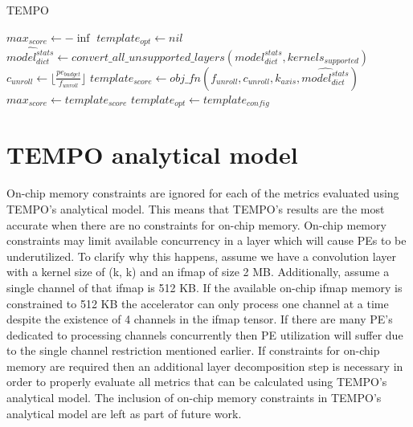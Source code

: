 \begin{algorithm}[H] 
    \caption{\ac{TEMPO}}
    \label{alg:tempo_algo}
    \begin{algorithmic}[1]
    \Statex 
        \State $max_{score} \gets -\inf$
        \State $template_{opt} \gets nil$
        \State $\hat{model^{stats}_{dict}} \gets convert\_all\_unsupported\_layers(model^{stats}_{dict}, kernels_{supported})$
                \State $c_{unroll} \gets \lfloor \frac{pe_{budget}}{f_{unroll}} \rfloor$ 
                \State $template_{score} \gets obj\_fn(f_{unroll}, c_{unroll}, k_{axis}, \hat{model^{stats}_{dict}})$
                    \State $max_{score} \gets template_{score}$
                    \State $template_{opt} \gets template_{config}$
                \EndIf
            \EndFor
        \EndFor
        \State {}
    \EndFunction
    \end{algorithmic}
\end{algorithm}

\section{TEMPO analytical model}
\label{chap:dataflow_dse:exploring:tempo_model}

On-chip memory constraints are ignored for each of the metrics evaluated using
TEMPO's analytical model. This means that TEMPO's results are the most accurate
when there are no constraints for on-chip memory. On-chip memory constraints may
limit available concurrency in a layer which will cause PEs to be underutilized.
To clarify why this happens, assume we have a convolution layer with a kernel
size of (k, k) and an ifmap of size 2 MB. Additionally, assume a single channel
of that ifmap is 512 KB. If the available on-chip ifmap memory is constrained to
512 KB the accelerator can only process one channel at a time despite the
existence of 4 channels in the ifmap tensor. If there are many PE's dedicated to
processing channels concurrently then PE utilization will suffer due to the
single channel restriction mentioned earlier. If constraints for on-chip memory
are required then an additional layer decomposition step is necessary in order
to properly evaluate all metrics that can be calculated using TEMPO's analytical
model. The inclusion of on-chip memory constraints in TEMPO's analytical model
are left as part of future work.  


